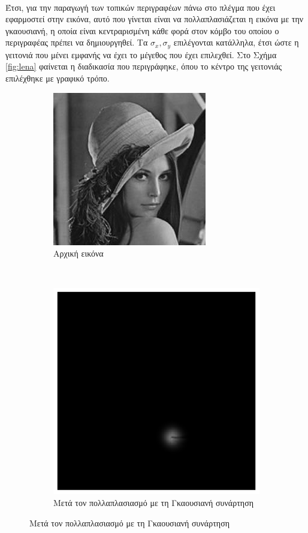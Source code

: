 \paragraph*{}
Έτσι, για την παραγωγή των τοπικών περιγραφέων πάνω στο πλέγμα που έχει εφαρμοστεί στην εικόνα, αυτό που γίνεται είναι να πολλαπλασιάζεται η εικόνα με την γκαουσιανή, η οποία είναι κεντραρισμένη κάθε φορά στον κόμβο του οποίου ο περιγραφέας πρέπει να δημιουργηθεί. Τα $\sigma_x,\sigma_y$ επιλέγονται κατάλληλα, έτσι ώστε η γειτονιά που μένει εμφανής να έχει το μέγεθος που έχει επιλεχθεί. Στο Σχήμα \ref{fig:lena} φαίνεται η διαδικασία που περιγράφηκε, όπου το κέντρο της γειτονιάς επιλέχθηκε με γραφικό τρόπο.


\begin{figure}[!b]
        \centering
        \begin{subfigure}[t]{0.5\textwidth}
                \centerline{\includegraphics[scale = 0.7]{./images/examples/lena.jpg}}
                \caption{Αρχική εικόνα}
        \end{subfigure}%
		~
        \centering
        \begin{subfigure}[t]{0.5\textwidth}
                \centerline{\includegraphics[scale = 0.35]{./images/examples/pointNo3afterGaussian.png}}
                \caption{Μετά τον πολλαπλασιασμό με τη Γκαουσιανή συνάρτηση}
        \end{subfigure}%


\end{figure}
